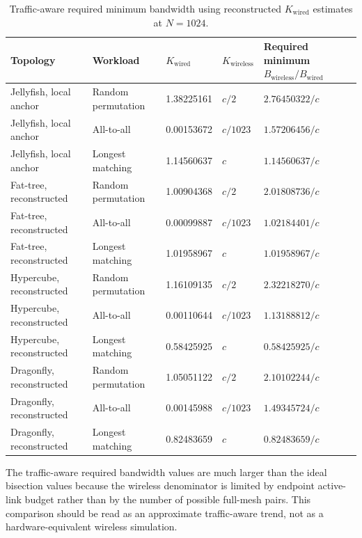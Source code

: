 \documentclass[conference]{IEEEtran}
\begin{document}
\begin{table}[!t]
\centering
\caption{Traffic-aware required minimum bandwidth using reconstructed \(K_{\mathrm{wired}}\) estimates at \(N=1024\).}
\label{tab:traffic-reconstructed}
\small
\setlength{\tabcolsep}{4pt}
\begin{tabular}{@{}p{}p{}p{}p{}p{}@{}}
\toprule
Topology & Workload & \(K_{\mathrm{wired}}\) & \(K_{\mathrm{wireless}}\) & Required minimum \(B_{\mathrm{wireless}}/B_{\mathrm{wired}}\) \\
\midrule
Jellyfish, local anchor & Random permutation & 1.38225161 & \(c/2\) & \(2.76450322/c\) \\
Jellyfish, local anchor & All-to-all & 0.00153672 & \(c/1023\) & \(1.57206456/c\) \\
Jellyfish, local anchor & Longest matching & 1.14560637 & \(c\) & \(1.14560637/c\) \\
Fat-tree, reconstructed & Random permutation & 1.00904368 & \(c/2\) & \(2.01808736/c\) \\
Fat-tree, reconstructed & All-to-all & 0.00099887 & \(c/1023\) & \(1.02184401/c\) \\
Fat-tree, reconstructed & Longest matching & 1.01958967 & \(c\) & \(1.01958967/c\) \\
Hypercube, reconstructed & Random permutation & 1.16109135 & \(c/2\) & \(2.32218270/c\) \\
Hypercube, reconstructed & All-to-all & 0.00110644 & \(c/1023\) & \(1.13188812/c\) \\
Hypercube, reconstructed & Longest matching & 0.58425925 & \(c\) & \(0.58425925/c\) \\
Dragonfly, reconstructed & Random permutation & 1.05051122 & \(c/2\) & \(2.10102244/c\) \\
Dragonfly, reconstructed & All-to-all & 0.00145988 & \(c/1023\) & \(1.49345724/c\) \\
Dragonfly, reconstructed & Longest matching & 0.82483659 & \(c\) & \(0.82483659/c\) \\
\bottomrule
\end{tabular}
\end{table}

The traffic-aware required bandwidth values are much larger than the ideal bisection values because the wireless denominator is limited by endpoint active-link budget rather than by the number of possible full-mesh pairs. This comparison should be read as an approximate traffic-aware trend, not as a hardware-equivalent wireless simulation.
\end{document}
